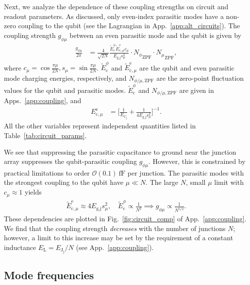 \documentclass[%
reprint,
superscriptaddress,
 amsmath,amssymb,
 aps,
 prx,
longbibliography,
floatfix,
]{revtex4-2}
\begin{document}
Next, we analyze the dependence of these coupling strengths on circuit and readout parameters. As discussed, only even-index parasitic modes have a non-zero coupling to the qubit (see the Lagrangian in App.~\ref{app:alt_circuits}). The coupling strength $g_{\phi \mu}$ between an even parasitic mode and the qubit is given by
\begin{align}
\frac{g_{\phi\mu}}{2\pi}&=\frac{4}{\sqrt{2N}} \frac{\tilde{E}^\phi_\textrm{c}\tilde{E}^\textrm{e}_{\textrm{c},\mu}c_\mu}{E_{\textrm{g,j}}s_\mu^2} \cdot {N_\phi}_{\mathrm{ZPF}} \cdot {N_\mu}_{\mathrm{ZPF}},
\end{align}
where $c_\mu=\cos{\frac{\pi\mu}{2N}}, s_\mu = \sin \frac{\pi \mu}{2N}$. $\tilde{E}_\textrm{c}^\phi$ and $\tilde{E}^\textrm{e}_{\textrm{c},\mu}$ are the qubit and even parasitic mode charging energies, respectively, and $N_{\phi/\mu,\mathrm{ZPF}}$ are the zero-point fluctuation values for the qubit and parasitic modes. $\tilde{E}_\textrm{c}^\phi$ and $N_{\phi/\mu,\mathrm{ZPF}}$ are given in Apps.~\ref{app:coupling}, and
\begin{align}
E_{\textrm{c},\mu}^\textrm{e}&=\Big[\frac{1}{E_{\textrm{C}_\textrm{j}}}+\frac{1}{4E_{\textrm{g,j}}s_\mu^2}\Big]^{-1}.\label{eq:parasitic}
\end{align}
All the other variables represent independent quantities listed in Table~\ref{tab:circuit_params}.

We see that suppressing the parasitic capacitance to ground near the junction array suppresses the qubit-parasitic coupling $g_{\phi\mu}$. However, this is constrained by practical limitations to order $\mathcal{O}(0.1) \ \mathrm{fF}$ per junction. The parasitic modes with the strongest coupling to the qubit have $\mu\ll N$. The large $N$, small $\mu$ limit with $c_\mu\approx 1$ yields
\begin{align}
    \tilde{E}^\textrm{e}_{\textrm{c},\mu}\approx 4E_{\textrm{g,j}}s_\mu^2, \quad \tilde{E}^\phi_\textrm{c}\propto \frac{1}{N^2}\implies g_{\phi\mu}\propto \frac{1}{N^{5/2}}.\label{eq:dep1}
\end{align}
These dependencies are plotted in Fig.~\ref{fig:circuit_comp} of App.~\ref{app:coupling}. We find that the coupling strength \textit{decreases} with the number of junctions $N$; however, a limit to this increase may be set by the requirement of a constant inductance $E_\textrm{L}=E_{\textrm{J}_\textrm{j}}/N$ (see App.~\ref{app:coupling}).

\subsection{Mode frequencies}\label{mode-frequencies}
\end{document}
